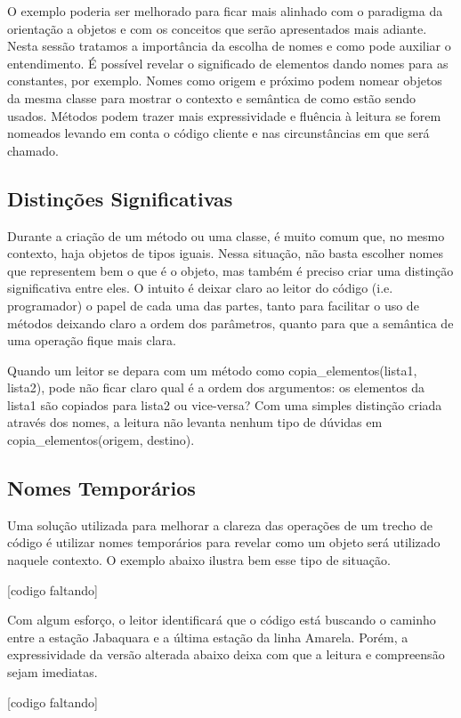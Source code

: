 	O exemplo poderia ser melhorado para ficar mais alinhado com o paradigma da orientação a objetos e com os conceitos que serão apresentados mais adiante. Nesta sessão tratamos a importância da escolha de nomes e como pode auxiliar o entendimento. É possível revelar o significado de elementos dando nomes para as constantes, por exemplo. Nomes como origem e próximo podem nomear objetos da mesma classe para mostrar o contexto e semântica de como estão sendo usados. Métodos podem trazer mais expressividade e fluência à leitura se forem nomeados levando em conta o código cliente e nas circunstâncias em que será chamado.

\subsection{Distinções Significativas}
	Durante a criação de um método ou uma classe, é muito comum que, no mesmo contexto, haja  objetos de tipos iguais. Nessa situação, não basta escolher nomes que representem bem o que é o objeto, mas também é preciso criar uma distinção significativa entre eles. O intuito é deixar claro ao leitor do código  (i.e. programador) o papel de cada uma das partes, tanto para facilitar o uso de métodos deixando claro a ordem dos parâmetros, quanto para que a semântica de uma operação fique mais clara.
	
	Quando um leitor se depara com um método como copia_elementos(lista1, lista2), pode não ficar claro qual é a ordem dos argumentos: os elementos da lista1 são copiados para lista2 ou vice-versa? Com uma simples distinção criada através dos nomes, a leitura não levanta nenhum tipo de dúvidas em copia_elementos(origem, destino).

\subsection{Nomes Temporários}
	Uma solução utilizada para melhorar a clareza das operações de um trecho de código é utilizar nomes temporários para revelar como um objeto será utilizado naquele contexto. O exemplo abaixo ilustra bem esse tipo de situação.

[codigo faltando]

	Com algum esforço, o leitor identificará que o código está buscando o caminho entre a estação Jabaquara e a última estação da linha Amarela. Porém, a expressividade da versão alterada abaixo deixa com que a leitura e compreensão sejam imediatas.

[codigo faltando]

